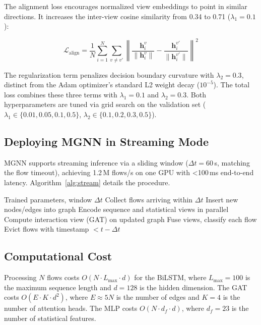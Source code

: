\documentclass[conference]{IEEEtran}
\newcommand{\MGNN}{\textsc{MGNN}}
\begin{document}
The alignment loss encourages normalized view embeddings to point in similar directions. It increases the inter-view cosine similarity from 0.34 to 0.71 ($\lambda_1=0.1$):

\begin{equation}
    \mathcal{L}_{\text{align}} = \frac{1}{N} \sum_{i=1}^{N} \sum_{v \neq v'}
    \left\| \frac{\mathbf{h}_i^{v}}{\|\mathbf{h}_i^{v}\|} - \frac{\mathbf{h}_i^{v'}}{\|\mathbf{h}_i^{v'}\|} \right\|^2
\end{equation}

The regularization term penalizes decision boundary curvature with $\lambda_2=0.3$, distinct from the Adam optimizer's standard L2 weight decay ($10^{-5}$).
The total loss combines these three terms with $\lambda_1=0.1$ and $\lambda_2=0.3$. Both hyperparameters are tuned via grid search on the validation set ($\lambda_1 \in \{0.01,0.05,0.1,0.5\}$, $\lambda_2 \in \{0.1,0.2,0.3,0.5\}$).

\subsection{Deploying MGNN in Streaming Mode}
MGNN supports streaming inference via a sliding window ($\Delta t = 60$\,s, matching the flow timeout), achieving 1.2\,M flows/s on one GPU with <100\,ms end-to-end latency. Algorithm~\ref{alg:stream} details the procedure.

\begin{algorithm}[t]
\caption{\MGNN{} streaming inference}
\label{alg:stream}

\begin{algorithmic}[1]
\REQUIRE Trained parameters, window $\Delta t$
\LOOP
    \STATE Collect flows arriving within $\Delta t$
    \STATE Insert new nodes/edges into graph
    \STATE Encode sequence and statistical views in parallel
    \STATE Compute interaction view (GAT) on updated graph
    \STATE Fuse views, classify each flow
    \STATE Evict flows with timestamp $< t - \Delta t$
\ENDLOOP

\end{algorithmic}

\end{algorithm}

\subsection{Computational Cost}

Processing $N$ flows costs $O(N \cdot L_{\max} \cdot d)$ for the BiLSTM, where $L_{\max}=100$ is the maximum sequence length and $d=128$ is the hidden dimension. The GAT costs $O(E \cdot K \cdot d^2)$, where $E\approx5N$ is the number of edges and $K=4$ is the number of attention heads. The MLP costs $O(N \cdot d_f \cdot d)$, where $d_f=23$ is the number of statistical features.
\end{document}
